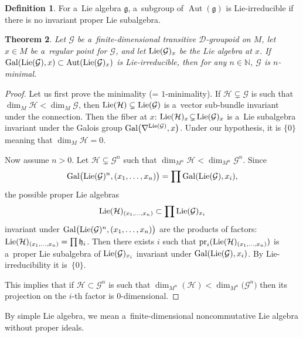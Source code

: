 \documentclass[pdftex]{sigma}
\numberwithin{equation}{section}
\newtheorem{Theorem}{Theorem}[section]
\theoremstyle{definition}
\newtheorem{Definition}[Theorem]{Definition}
\begin{document}
\begin{Definition}
For a~Lie algebra $\mathfrak g$, a~subgroup of $\operatorname{Aut}(\mathfrak g)$ is Lie-irreducible if there is no invariant proper Lie subalgebra.
\end{Definition}

\begin{Theorem}\label{thm:6}
 Let $\mathcal G$ be a~finite-dimensional transitive $\mathcal D$-groupoid on $M$, let $x\in M$ be a~regular point for $\mathcal G$, and let ${\rm Lie}(\mathcal G)_x$ be the Lie algebra at $x$.
 If ${\rm Gal}({\rm Lie}(\mathcal G),x) \subset \operatorname{Aut}({\rm Lie}(\mathcal G)_x)$ is Lie-irreducible, then for any $n \in \mathbb N$, $\mathcal G$ is $n$-minimal.
\end{Theorem}

\begin{proof}
Let us first prove the minimality (= $1$-minimality). If $\mathcal H \subsetneq \mathcal G$ is such that $\dim_M \mathcal H < \dim_M \mathcal G$, then ${\rm Lie}(\mathcal H)\subsetneq {\rm Lie}(\mathcal G)$ is a~vector sub-bundle invariant under the connection. Then the fiber at $x$: ${\rm Lie}(\mathcal H)_x \!\subsetneq\! {\rm Lie}(\mathcal G)_x$ is a~Lie subalgebra invariant under the Galois group ${\rm Gal}\bigl(\nabla^{{\rm Lie}(\mathcal G)}, x\bigr)$. Under our hypothesis, it is $\{0\}$ meaning that $\dim_M \mathcal H = 0$.

Now assume $n > 0$. Let $\mathcal H\subsetneq \mathcal G^n$ such that $\dim_{M^n} \mathcal H < \dim_{M^n} \mathcal G^n$. Since
\[
{\rm Gal}\bigl({\rm Lie}(\mathcal G) ^n,(x_1, \dots, x_n)\bigr) = \prod {\rm Gal}({\rm Lie}(\mathcal G), x_i),
\] the possible proper Lie algebras
\[
{\rm Lie}(\mathcal H)_{(x_1, \dots, x_n)} \subset \prod \mathfrak {\rm Lie}(\mathcal G)_{x_i}
\] invariant under ${\rm Gal}\bigl({\rm Lie}(\mathcal G) ^n,(x_1, \dots, x_n)\bigr)$ are the products of factors: ${\rm Lie}(\mathcal H)_{(x_1, \dots, x_n)} = \prod \mathfrak h_i$. Then there exists $i$ such that ${\rm pr}_i({\rm Lie}(\mathcal H)_{(x_1, \dots, x_n)})$ is a~proper Lie subalgebra of ${\rm Lie}(\mathcal G)_{x_i}$ invariant under ${\rm Gal}({\rm Lie}(\mathcal G), x_i)$. By Lie-irreducibility it is~$\{0\}$.

This implies that if $\mathcal H \subset \mathcal G^n$ is such that $\dim_{M^n}(\mathcal H) < \dim_{M^n}\bigl(\mathcal G^n\bigr)$ then its projection on the $i$-th factor is 0-dimensional.
\end{proof}

By simple Lie algebra, we mean a~finite-dimensional noncommutative Lie algebra without proper ideals.
\end{document}
